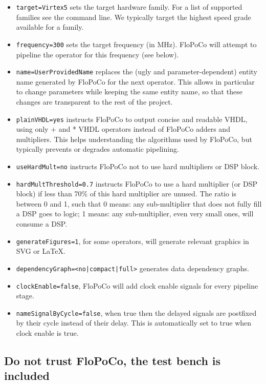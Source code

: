 \documentclass{article}
\begin{document}
\begin{itemize}
\item \texttt{target=Virtex5}  sets the target hardware family.
  	For a list of supported families see the command line. 
	We typically target the highest speed grade available for a family.
\item \texttt{frequency=300} sets the target frequency (in MHz). FloPoCo will attempt to pipeline the operator for this frequency (see  below).
\item \texttt{name=UserProvidedName} replaces the (ugly and parameter-dependent) entity name generated by FloPoCo for the next operator. 
This allows in particular to change parameters while keeping the same entity name, so that these changes are transparent to the rest of the project.
\item \texttt{plainVHDL=yes} instructs FloPoCo to output concise and readable VHDL, using only + and * VHDL operators instead of FloPoCo adders and multipliers.
This helps understanding the algorithms used by FloPoCo, but typically prevents or degrades automatic pipelining. 
\item \texttt{useHardMult=no} instructs FloPoCo not to use hard multipliers or DSP block.
\item \texttt{hardMultThreshold=0.7} instructs FloPoCo to use a hard multiplier (or DSP block) if less than 70\% of this hard multiplier are unused. 
 The ratio is between 0 and 1, such that
 0 means: any sub-multiplier that does not fully fill a DSP goes to logic; 
 1 means: any sub-multiplier, even very small ones, will consume a DSP.
\item \texttt{generateFigures=1}, for some operators, will generate relevant graphics in SVG or LaTeX.
\item \texttt{dependencyGraph=<no|compact|full>}  generates data dependency graphs. 
\item \texttt{clockEnable=false}, FloPoCo will add clock enable signals for every pipeline stage. 
\item \texttt{nameSignalByCycle=false}, when true then the delayed signals are postfixed by their cycle instead of their delay. This is automatically set to true when clock enable is true. 

\end{itemize}


\subsection{Do not trust FloPoCo, the test bench is included}
\end{document}
